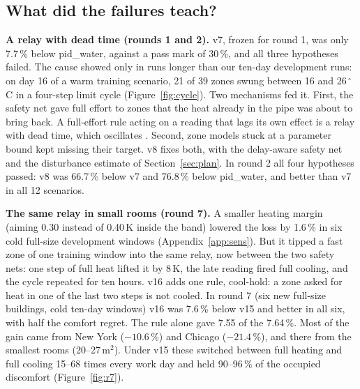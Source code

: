 \documentclass{article}
\begin{document}
\subsection{What did the failures teach?}\label{sec:cycle}\label{sec:r2}\label{sec:r7}
\textbf{A relay with dead time (rounds 1 and 2).} v7, frozen for round 1, was only 7.7\,\% below pid\_water, against a
pass mark of 30\,\%, and all three hypotheses failed. The cause showed only in runs longer than our ten-day development
runs: on day 16 of a warm training scenario, 21 of 39 zones swung between 16 and 26\,$^\circ$C in a four-step limit
cycle (Figure~\ref{fig:cycle}). Two mechanisms fed it. First, the safety net gave full effort to
zones that the heat already in the pipe was about to bring back. A full-effort rule acting on a reading that lags its
own effect is a relay with dead time, which oscillates \cite{astrom1984relay}. Second, zone models stuck at a parameter
bound kept missing their target. v8 fixes both, with the delay-aware safety net and the disturbance estimate of
Section~\ref{sec:plan}. In round 2 all four hypotheses passed: v8 was 66.7\,\% below v7 and 76.8\,\% below pid\_water,
and better than v7 in all 12 scenarios.

\textbf{The same relay in small rooms (round 7).} A smaller heating margin (aiming 0.30 instead of 0.40\,K inside the
band) lowered the loss by 1.6\,\% in six cold full-size development windows (Appendix~\ref{app:sens}). But it tipped a
fast zone of one training window into the same relay, now between the two safety nets: one step of full heat lifted it
by 8\,K, the late reading fired full cooling, and the cycle repeated for ten hours. v16 adds one
rule, cool-hold: a zone asked for heat in one of the last two steps is not cooled. In round 7 (six new full-size
buildings, cold ten-day windows) v16 was 7.6\,\% below v15 and better in all six, with half the comfort regret. The
rule alone gave 7.55 of the 7.64\,\%. Most of the gain came from New York ($-10.6$\,\%) and Chicago ($-21.4$\,\%), and
there from the smallest rooms (20--27\,m$^2$). Under v15 these switched between full heating and full cooling
15--68 times every work day and held 90--96\,\% of the occupied discomfort (Figure~\ref{fig:r7}).
\end{document}
